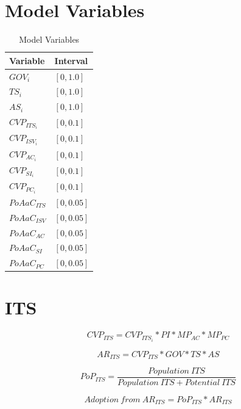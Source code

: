 \newpage
\section{Model Variables}
\begin{table}[tbh]
	\centering
	\begin{tabular}{ll}
			\toprule 
			Variable & Interval\\ \midrule
			$GOV_i$ & $[0,1.0]$ \\
			$TS_i$ & $[0,1.0]$ \\
			$AS_i$ & $[0,1.0]$ \\ \midrule
			$CVP_{ITS_i}$ & $[0,0.1]$ \\
			$CVP_{ISV_i}$ & $[0,0.1]$ \\
			$CVP_{AC_i}$ & $[0,0.1]$ \\
			$CVP_{SI_i}$ & $[0,0.1]$ \\
			$CVP_{PC_i}$ & $[0,0.1]$ \\ \midrule
			$PoAaC_{ITS}$ & $[0,0.05]$ \\
			$PoAaC_{ISV}$ & $[0,0.05]$ \\
			$PoAaC_{AC}$ & $[0,0.05]$ \\
			$PoAaC_{SI}$ & $[0,0.05]$ \\
			$PoAaC_{PC}$ & $[0,0.05]$ \\ \bottomrule
	\end{tabular}
	\caption{Model Variables}
	\label{tab:mvar}
\end{table}

\newpage
\section{ITS}

\begin{equation}
		CVP_{ITS} =  CVP_{ITS_{i}} * PI * MP_{AC} * MP_{PC}
\end{equation}

\begin{equation}
		AR_{ITS} = CVP_{ITS} * GOV * TS * AS		
\end{equation}

\begin{equation}
	PoP_{ITS} = \frac{\mathit{Population~ITS}}{\mathit{Population~ITS}+\mathit{Potential~ITS}}
\end{equation}

\begin{equation}
	\mathit{Adoption~from~AR_{ITS}} = PoP_{ITS} * AR_{ITS}
\end{equation}


